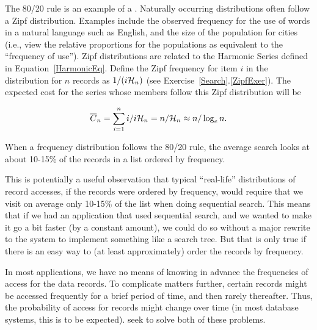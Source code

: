 \vspace{-\smallskipamount}
\begin{example}
\label{ZipfExamp}
The 80/20 rule is an example of a 
.
Naturally occurring distributions often follow a Zipf distribution.
Examples include the observed frequency for the use of words in a
natural language such as English, and the size of the population for
cities (i.e., view the relative proportions for the populations as
equivalent to the ``frequency of use'').
Zipf distributions are related to the
Harmonic Series
defined in Equation~\ref{HarmonicEq}.
Define the Zipf frequency for item \(i\) in the distribution for \(n\)
records as \(1/(i\mbox{${\cal H}_n$})\)
(see Exercise~\ref{Search}.\ref{ZipfExer}).
The expected cost for the series whose members follow this Zipf
distribution will be

\vspace{-\medskipamount}
\[ \overline{C}_n = \sum_{i=1}^n i/i\mbox{${\cal H}_n$} = n/\mbox{${\cal H}_n$} \approx
n/\log_e n.\]
\vspace{-\medskipamount}

\noindent When a frequency distribution follows the 80/20 rule, the
average search looks at about 10-15\% of the records in a list
ordered by frequency.
\end{example}

\vspace{-\smallskipamount}
This is potentially a useful observation that typical ``real-life''
distributions of record accesses, if the records were ordered by
frequency, would require that we visit on average only 10-15\% of the
list when doing sequential search.
This means that if we had an application that used sequential search,
and we wanted to make it go a bit faster (by a constant amount), we
could do so without a major rewrite to the system to implement
something like a search tree.
But that is only true if there is an easy way to (at least
approximately) order the records by frequency.

In most applications, we have no means of knowing in advance the
frequencies of access for the data records.
To complicate matters further, certain records might be accessed
frequently for a brief period of time, and then rarely thereafter.
Thus, the probability of access for records might change over time (in
most database systems, this is to be expected).
 seek to solve both of these problems.

